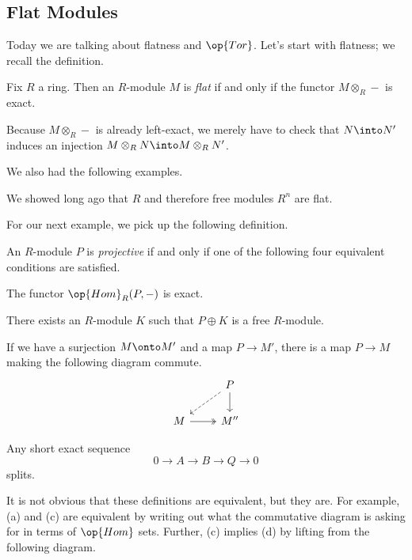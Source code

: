 \subsection{Flat Modules}
Today we are talking about flatness and $\op{Tor}$. Let's start with flatness; we recall the definition.
\begin{definition}[Flat]
	Fix $R$ a ring. Then an $R$-module $M$ is \textit{flat} if and only if the functor $M\otimes_R-$ is exact.
\end{definition} %
\begin{remark}
	Because $M\otimes_R-$ is already left-exact, we merely have to check that $N\into N'$ induces an injection $M\otimes_RN\into M\otimes_RN'$.
\end{remark}
We also had the following examples.
\begin{example}
	We showed long ago that $R$ and therefore free modules $R^n$ are flat.
\end{example} %
For our next example, we pick up the following definition.
\begin{definition}[Projective]
	An $R$-module $P$ is \textit{projective} if and only if one of the following four equivalent conditions are satisfied.
	\begin{listalph}
		\item The functor $\op{Hom}_R(P,-)$ is exact.
		\item There exists an $R$-module $K$ such that $P\oplus K$ is a free $R$-module.
		\item If we have a surjection $M\onto M'$ and a map $P\to M'$, there is a map $P\to M$ making the following diagram commute.
		\[\begin{tikzcd}
			& P \\
			M & {M''}
			\arrow[from=1-2, to=2-2]
			\arrow[dashed, from=1-2, to=2-1]
			\arrow[two heads, from=2-1, to=2-2]
		\end{tikzcd}\]
		\item Any short exact sequence
		\[0\to A\to B\to Q\to 0\]
		splits.
	\end{listalph}
\end{definition}
It is not obvious that these definitions are equivalent, but they are. For example, (a) and (c) are equivalent by writing out what the commutative diagram is asking for in terms of $\op{Hom}$ sets. Further, (c) implies (d) by lifting from the following diagram.
